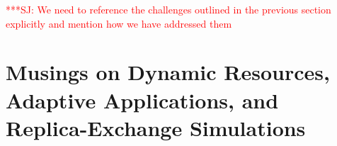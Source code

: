 \documentclass{rspublic}
\newcommand{\jhanote}[1]{ {\textcolor{red} { ***SJ: #1 }}}
\newcommand{\jhanote}[1]{}
\newcommand{\glidein}[1]{Glide-In }
\begin{document}
{%



               

  
    



\jhanote{We need to reference the challenges outlined in the previous
  section explicitly and mention how we have addressed them}

\section{Musings on Dynamic Resources, Adaptive Applications, and
  Replica-Exchange Simulations}

}
\end{document}
